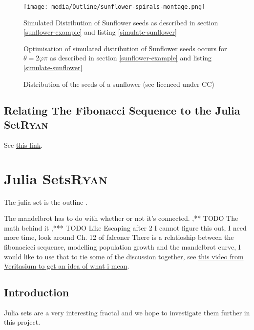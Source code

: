 \documentclass[a4paper,11pt,twoside]{article}
\begin{document}
\begin{figure}[htbp]
\centering
\texttt{[image: media/Outline/sunflower-spirals-montage.png]}
\caption{\label{simulate-sunflower-image}Simulated Distribution of Sunflower seeds as described in section \ref{sunflower-example} and listing \ref{simulate-sunflower}}
\end{figure}

\begin{figure}[htbp]
\centering

\caption{\label{simulate-sunflower-phi}Optimisation of simulated distribution of Sunflower seeds occurs for \(\theta =2 \varphi  \pi\) as described in section \ref{sunflower-example} and listing \ref{simulate-sunflower}}
\end{figure}


\begin{figure}[htbp]
\centering

\caption{\label{sunflower}Distribution of the seeds of a sunflower (see \cite{simonbrassCCSearch2006} licenced under CC)}
\end{figure}

\subsection{Relating The Fibonacci Sequence to the Julia Set\hfill{}\textsc{Ryan}}
\label{sec:org7cce5f9}
See \href{https://youtu.be/ovJcsL7vyrk}{this link}.
\section{Julia Sets\hfill{}\textsc{Ryan}}
\label{sec:org96abd24}

The julia set is the outline \cite[Ch. 14]{peitgenChaosFractalsNew2004}.

The mandelbrot has to do with whether or not it's connected.
,** TODO The math behind it
,*** TODO Like Escaping after 2
I cannot figure this out, I need more time, look around Ch. 12 of falconer \cite{falconerFractalGeometryMathematical2003}
There is a relatioship between the fibonacicci sequence, modelling population growth and the mandelbrot curve, I would like to use that to tie some of the discussion together, see \href{https://youtu.be/ovJcsL7vyrk}{this video from Veritasium to get an idea of what i mean}.


\subsection{Introduction}
\label{sec:org79d8ae7}
Julia sets are a very interesting fractal and we hope to investigate them further in this project.
\end{document}
